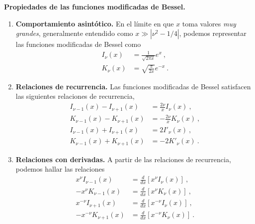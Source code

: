 \begin{propiedad}
    \textbf{Propiedades de las funciones modificadas de Bessel.}

    \begin{enumerate}
        \item \textbf{Comportamiento asintótico.} En el límite en que $x$ toma valores \emph{muy grandes}, generalmente entendido como $x \gg |\nu^2 - 1/4|$, podemos representar las funciones modificadas de Bessel como
        \begin{align}
            I_\nu(x) & = \frac{1}{\sqrt{2\pi x}} e^x \ , \\
            K_\nu(x) & = \sqrt{\frac{\pi}{2x}} e^{-x} \ . 
        \end{align}
        \item \textbf{Relaciones de recurrencia.} Las funciones modificadas de Bessel satisfacen las siguientes relaciones de recurrencia,
        \begin{align}
            I_{\nu - 1}(x) - I_{\nu + 1}(x) & =   \frac{2\nu}{x} I_\nu(x) \ , \\
            K_{\nu - 1}(x) - K_{\nu + 1}(x) & = - \frac{2\nu}{x} K_\nu(x) \ , \\
            I_{\nu - 1}(x) + I_{\nu + 1}(x) & =   2 I'_\nu(x) \ , \\
            K_{\nu - 1}(x) + K_{\nu + 1}(x) & = - 2 K'_\nu(x) \ .
        \end{align}
        \item \textbf{Relaciones con derivadas.} A partir de las relaciones de recurrencia, podemos hallar las relaciones
        \begin{align}
            x^{\nu} I_{\nu - 1}(x)    & = \frac{d}{dx}[x^\nu    I_\nu(x)] \ , \\
            - x^{\nu} K_{\nu - 1}(x)  & = \frac{d}{dx}[x^\nu    K_\nu(x)] \ , \\
            x^{-\nu} I_{\nu + 1}(x)   & = \frac{d}{dx}[x^{-\nu} I_\nu(x)] \ , \\
            - x^{-\nu} K_{\nu + 1}(x) & = \frac{d}{dx}[x^{-\nu} K_\nu(x)] \ .
        \end{align}
    \end{enumerate}
\end{propiedad}

